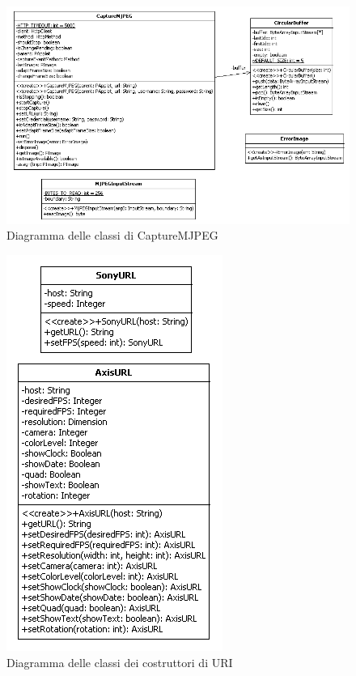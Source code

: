\documentclass[a4paper,11pt]{article}
\begin{document}
\begin{figure}
  \centering
  \includegraphics[scale=0.7,angle=90]{img/capturemjpegclass.png}
  \caption{Diagramma delle classi di CaptureMJPEG}
  \label{fig:class_diagram1}
\end{figure}
\begin{figure}
  \centering
  \includegraphics[scale=0.9]{img/uribuilders.png}
  \caption{Diagramma delle classi dei costruttori di URI}
  \label{fig:class_diagram2}
\end{figure}
\end{document}
